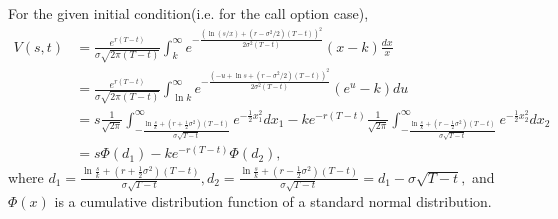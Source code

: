 	For the given initial condition(i.e. for the call option case),
	\begin{align*}
		V(s,t) &= \frac{e^{r(T-t)}}{\sigma\sqrt{2\pi(T-t)}}\int_{k}^{\infty} e^{-\frac{\left(\ln(s/x)+(r-\sigma^2/2)(T-t)\right)^2}{2\sigma^2(T-t)}}(x-k) \frac{dx}{x}\\
		&= \frac{e^{r(T-t)}}{\sigma\sqrt{2\pi(T-t)}}\int_{\ln k}^{\infty} e^{-\frac{\left(-u+\ln s+(r-\sigma^2/2)(T-t)\right)^2}{2\sigma^2(T-t)}}(e^u-k) du\\
		&= s\frac{1}{\sqrt{2\pi}}\int_{-\frac{\ln\frac{s}{k}+\left(r+\frac{1}{2}\sigma^2\right)(T-t)}{\sigma\sqrt{T-t}}}^{\infty}e^{-\frac{1}{2}x_1^2}dx_1 - ke^{-r(T-t)}\frac{1}{\sqrt{2\pi}}\int_{-\frac{\ln\frac{s}{k}+\left(r-\frac{1}{2}\sigma^2\right)(T-t)}{\sigma\sqrt{T-t}}}^{\infty}e^{-\frac{1}{2}x_2^2}dx_2\\
		&= s\Phi(d_1)-ke^{-r(T-t)}\Phi(d_2),
		\end{align*}
		where $d_1 = \frac{\ln\frac{s}{k}+\left(r+\frac{1}{2}\sigma^2\right)(T-t)}{\sigma\sqrt{T-t}}, d_2 = \frac{\ln\frac{s}{k}+\left(r-\frac{1}{2}\sigma^2\right)(T-t)}{\sigma\sqrt{T-t}} = d_1-\sigma\sqrt{T-t},$ and $\Phi(x)$ is a cumulative distribution function of a standard normal distribution.